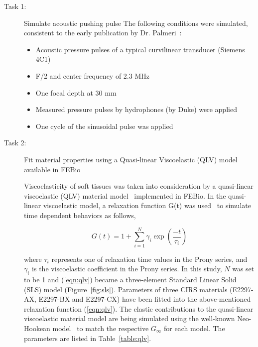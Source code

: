 \begin{description}
    \item[Task 1:] Simulate acoustic pushing pulse
        The following conditions were simulated, consistent to the early
        publication by Dr.  Palmeri~\cite{Palmeri2008}:
        \begin{itemize}
            \item Acoustic pressure pulses of a typical curvilinear transducer (Siemens 4C1)
            \item F/2 and center frequency of 2.3 MHz
            \item One focal depth at 30 mm
            \item Measured pressure pulses by hydrophones (by Duke) were applied
            \item One cycle of the sinusoidal pulse was applied
        \end{itemize}
    \item[Task 2:] Fit material properties using a Quasi-linear Viscoelastic
    (QLV) model available in FEBio~\cite{Weiss2012}
        
    Viscoelasticity of soft tissues was taken into consideration by a
    quasi-linear viscoelastic (QLV) material model~\cite{Fung1993a} implemented
    in FEBio.  In the quasi-linear viscoelastic model, a relaxation function
    G(t) was used~\cite{Gerig2003} to simulate time dependent behaviors as
    follows,

    \begin{equation}\label{eqn:qlv}
        G(t) = 1 + \sum\limits_{i=1}^N \gamma_i \exp\left(\frac{-t}{\tau_i}\right)
    \end{equation}

    where $\tau_i$ represents one of relaxation time values in the Prony
    series, and $\gamma_i$ is the viscoelastic coefficient in the Prony series.
    In this study, $N$ was set to be 1 and (\ref{eqn:qlv}) became a
    three-element Standard Linear Solid (SLS) model (Figure~\ref{fig:sls}).
    Parameters of three CIRS materials (E2297-AX, E2297-BX and E2297-CX) have
    been fitted into the above-mentioned relaxation function (\ref{eqn:qlv}).
    The elastic contributions to the quasi-linear viscoelastic material model
    are being simulated using the well-known Neo-Hookean model~\cite{Fung1993a}
    to match the respective $G_\infty$ for each model. The parameters are listed
    in Table~\ref{table:qlv}.


\end{description}
